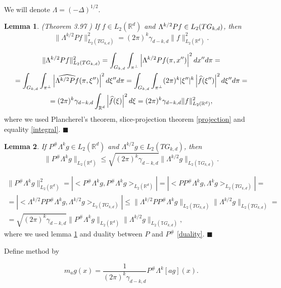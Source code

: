 \documentclass[12pt]{iopart}
\newtheorem{lemma}{Lemma}
\newenvironment{proof}
{\par\noindent{\bf Proof}}
{\hfill$\scriptstyle\blacksquare$}
\begin{document}
We will denote $\Lambda = (-\Delta)^{1/2}$.

\begin{lemma} (Theorem 3.97 \cite{MA})
\label{isometry}
If $f\in L_2(\mathbb R^d)$ and $\Lambda^{k/2}Pf\in L_2(\mathbb \mathfrak TG_{k,d})$, then
$$\|\Lambda^{k/2}Pf\|^2_{L_2(TG_{k,d})}=(2\pi)^k\gamma_{d-k,d}\|f\|^2_{L_2(\mathbb R^d)}.$$
\end{lemma}

\begin{proof}
\begin{multline*}
\|\Lambda^{k/2}Pf\|^2_{L_2(TG_{k,d})}=\int_{G_{k,d}}\int_{\pi^\perp}\left|\Lambda^{k/2}Pf(\pi,x'')\right|^2dx''d\pi=\\
=\int_{G_{k,d}}\int_{\pi^\perp}\left|\widehat{\Lambda^{k/2}Pf}(\pi,\xi'')\right|^2d\xi''d\pi=\int_{G_{k,d}}\int_{\pi^\perp}(2\pi)^k|\xi''|^k\left|\widehat{f}(\xi'')\right|^2d\xi''d\pi=\\
=(2\pi)^k\gamma_{d-k,d}\int_{\mathbb R^d}\left|\widehat{f}(\xi)\right|^2d\xi =(2\pi)^k\gamma_{d-k,d}\|f\|^2_{L_2(\mathbb R^d)},$$
\end{multline*}
where we used Plancherel's theorem, slice-projection theorem \ref{projection} and equality \eqref{integral}.
\end{proof}

\begin{lemma}
\label{lemma2}
If $P^\#\Lambda^kg\in L_2(\mathbb R^d)$ and $\Lambda^{k/2}g\in L_2(TG_{k,d})$, then
$$\|P^\#\Lambda^kg\|_{L_2(\mathbb R^d)}\le\sqrt{(2\pi)^k\gamma_{d-k,d}}\|\Lambda^{k/2}g\|_{L_2(\mathbb TG_{k,d})}.$$
\end{lemma}

\begin{proof}
\begin{multline*}
\|P^\#\Lambda^kg\|_{L_2(\mathbb R^d)}^2=|<P^\#\Lambda^kg,P^\#\Lambda^kg>_{L_2(\mathbb R^d)}|=|<PP^\#\Lambda^kg,\Lambda^kg>_{L_2(TG_{k,d})}|=\\
=|<\Lambda^{k/2}PP^\#\Lambda^kg,\Lambda^{k/2}g>_{L_2(TG_{k,d})}|\le\|\Lambda^{k/2}PP^\#\Lambda^kg\|_{L_2(TG_{k,d})}\|\Lambda^{k/2}g\|_{L_2(TG_{k,d})}=\\
=\sqrt{(2\pi)^k\gamma_{d-k,d}}\|P^\#\Lambda^kg\|_{L_2(\mathbb R^d)}\|\Lambda^{k/2}g\|_{L_2(\mathbb TG_{k,d})},
\end{multline*}
where we used lemma \ref{isometry} and duality between $P$ and $P^\#$ \ref{duality}.
\end{proof}

Define method by 

$$m_ag(x) = \frac{1}{(2\pi)^k\gamma_{d-k,d}}P^\#\Lambda^k[a g](x).$$
\end{document}
